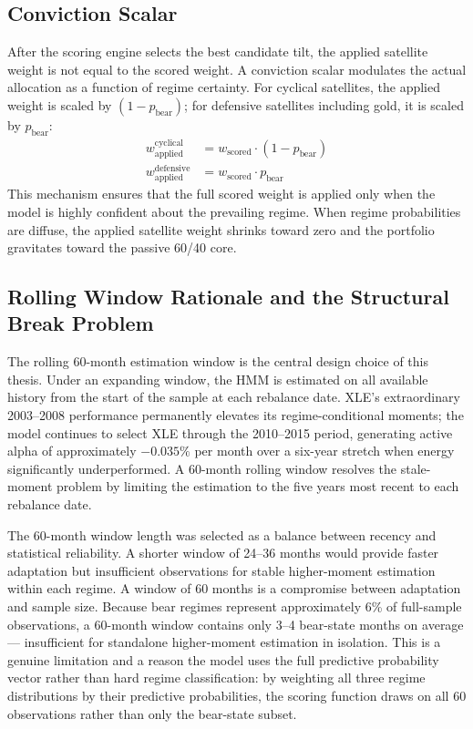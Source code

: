 \documentclass[12pt, a4paper]{article}
\begin{document}
\subsection{Conviction Scalar}

After the scoring engine selects the best candidate tilt, the applied satellite weight is
not equal to the scored weight. A conviction scalar modulates the actual allocation as a
function of regime certainty. For cyclical satellites, the applied weight is scaled by
$(1 - p_{\text{bear}})$; for defensive satellites including gold, it is scaled by
$p_{\text{bear}}$:
\begin{align}
  w_{\text{applied}}^{\text{cyclical}}  &= w_{\text{scored}} \cdot (1 - p_{\text{bear}}) \\
  w_{\text{applied}}^{\text{defensive}} &= w_{\text{scored}} \cdot p_{\text{bear}}
\end{align}
This mechanism ensures that the full scored weight is applied only when the model is highly
confident about the prevailing regime. When regime probabilities are diffuse, the applied
satellite weight shrinks toward zero and the portfolio gravitates toward the passive 60/40
core.

\subsection{Rolling Window Rationale and the Structural Break Problem}

The rolling 60-month estimation window is the central design choice of this thesis. Under an expanding window, the HMM is estimated on all available history from the
start of the sample at each rebalance date. XLE's extraordinary 2003--2008 performance
permanently elevates its regime-conditional moments; the model continues to select XLE
through the 2010--2015 period, generating active alpha of approximately $-0.035\%$ per month
over a six-year stretch when energy significantly underperformed. A 60-month rolling window
resolves the stale-moment problem by limiting the estimation to the five years most recent
to each rebalance date.

The 60-month window length was selected as a balance between recency and statistical
reliability. A shorter window of 24--36 months would provide faster adaptation but
insufficient observations for stable higher-moment estimation within each regime. A window
of 60 months is a compromise between adaptation and sample size. Because bear regimes
represent approximately 6\% of full-sample observations, a 60-month window contains
only 3--4 bear-state months on average --- insufficient for standalone higher-moment
estimation in isolation. This is a genuine limitation and a reason the model uses the
full predictive probability vector rather than hard regime classification: by weighting
all three regime distributions by their predictive probabilities, the scoring function
draws on all 60 observations rather than only the bear-state subset.
\end{document}
